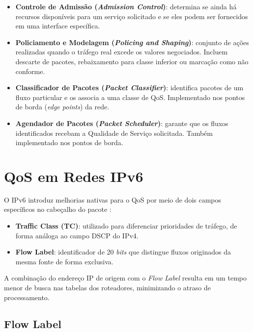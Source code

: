 \begin{itemize}
  \item \textbf{Controle de Admissão (\textit{Admission Control})}: determina se
  ainda há recursos disponíveis para um serviço solicitado e se eles podem ser
  fornecidos em uma interface específica.
  \item \textbf{Policiamento e Modelagem (\textit{Policing and Shaping})}: conjunto
  de ações realizadas quando o tráfego real excede os valores negociados. Incluem
  descarte de pacotes, rebaixamento para classe inferior ou marcação como não
  conforme.
  \item \textbf{Classificador de Pacotes (\textit{Packet Classifier})}: identifica
  pacotes de um fluxo particular e os associa a uma classe de QoS. Implementado
  nos pontos de borda (\textit{edge points}) da rede.
  \item \textbf{Agendador de Pacotes (\textit{Packet Scheduler})}: garante que os
  fluxos identificados recebam a Qualidade de Serviço solicitada. Também
  implementado nos pontos de borda.
\end{itemize}

\section{QoS em Redes IPv6}

O IPv6 introduz melhorias nativas para o QoS por meio de dois campos específicos
no cabeçalho do pacote \cite{ieee_ipv6qos}:

\begin{itemize}
  \item \textbf{Traffic Class (TC)}: utilizado para diferenciar prioridades de
  tráfego, de forma análoga ao campo DSCP do IPv4.
  \item \textbf{Flow Label}: identificador de 20 \textit{bits} que distingue
  fluxos originados da mesma fonte de forma exclusiva.
\end{itemize}

A combinação do endereço IP de origem com o \textit{Flow Label} resulta em um
tempo menor de busca nas tabelas dos roteadores, minimizando o atraso de
processamento.

\subsection{Flow Label}

